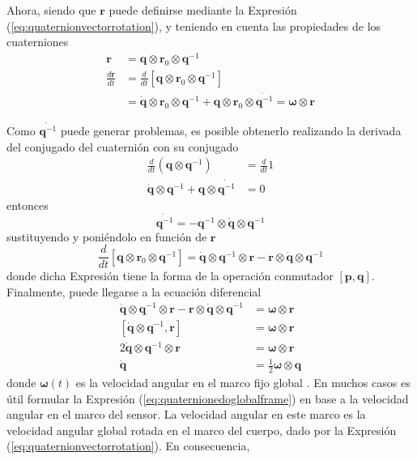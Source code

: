 Ahora, siendo que $\bm{r}$ puede definirse mediante la Expresión (\ref{eq:quaternionvectorrotation}), y teniendo en cuenta las propiedades de los cuaterniones
\begin{align}
    \bm{r} &= \bm{q}\otimes \bm{r}_0 \otimes \bm{q}^{-1} \\
    \frac{d\bm{r}}{dt} &= \frac{d}{dt}\left[\bm{q}\otimes\bm{r}_0\otimes\bm{q}^{-1}\right] \\
    &= \dot{\bm{q}}\otimes\bm{r}_0\otimes\bm{q}^{-1} + \bm{q}\otimes\bm{r}_0\otimes\dot{\bm{q}^{-1}} = \bm{\omega}\otimes\bm{r}
\end{align}

Como $\dot{\bm{q}^{-1}}$ puede generar problemas, es posible obtenerlo realizando la derivada del conjugado del cuaternión con su conjugado
\begin{align}
    \frac{d}{dt}\left(\bm{q}\otimes\bm{q}^{-1}\right) &= \frac{d}{dt}1 \\
    \dot{\bm{q}}\otimes\bm{q}^{-1} + \bm{q}\otimes\dot{\bm{q}^{-1}} &= 0
\end{align}
entonces
\begin{equation}
    \dot{\bm{q}^{-1}} = -\bm{q}^{-1}\otimes\dot{\bm{q}}\otimes\bm{q}^{-1}
\end{equation}
sustituyendo y poniéndolo en función de $\bm{r}$
\begin{equation}
        \frac{d}{dt}\left[\bm{q}\otimes\bm{r}_0\otimes\bm{q}^{-1}\right] = \dot{\bm{q}}\otimes\bm{q}^{-1}\otimes\bm{r} - \bm{r}\otimes\dot{\bm{q}}\otimes\bm{q}^{-1}
\end{equation}
donde dicha Expresión tiene la forma de la operación conmutador $\left[\bm{p},\bm{q}\right]$. Finalmente, puede llegarse a la ecuación diferencial
\begin{align}
    \dot{\bm{q}}\otimes\bm{q}^{-1}\otimes\bm{r} - \bm{r}\otimes\dot{\bm{q}}\otimes\bm{q}^{-1} &= \bm{\omega}\otimes\bm{r} \\
    \left[\dot{\bm{q}}\otimes\bm{q}^{-1},\bm{r}\right] &= \bm{\omega}\otimes\bm{r} \\
    2\dot{\bm{q}}\otimes\bm{q}^{-1}\otimes\bm{r} &= \bm{\omega}\otimes\bm{r} \\
    \dot{\bm{q}} &= \frac{1}{2}\bm{\omega}\otimes\bm{q}
    \label{eq:quaternionedoglobalframe}
\end{align}
donde $\bm{\omega}(t)$ es la velocidad angular en el marco fijo global \cite{sola2017}. En muchos casos es útil formular la Expresión (\ref{eq:quaternionedoglobalframe}) en base a la velocidad angular en el marco del sensor. La velocidad angular en este marco es la velocidad angular global rotada en el marco del cuerpo, dado por la Expresión (\ref{eq:quaternionvectorrotation}). En consecuencia,
